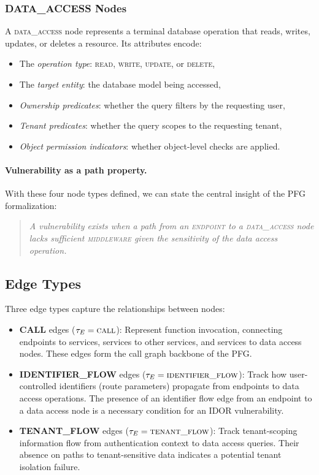 \subsubsection{DATA\_ACCESS Nodes}

A \textsc{data\_access} node represents a terminal database operation that reads, writes, updates, or deletes a resource. Its attributes encode:
\begin{itemize}
    \item The \emph{operation type}: \textsc{read}, \textsc{write}, \textsc{update}, or \textsc{delete},
    \item The \emph{target entity}: the database model being accessed,
    \item \emph{Ownership predicates}: whether the query filters by the requesting user,
    \item \emph{Tenant predicates}: whether the query scopes to the requesting tenant,
    \item \emph{Object permission indicators}: whether object-level checks are applied.
\end{itemize}

\paragraph{Vulnerability as a path property.} With these four node types defined, we can state the central insight of the PFG formalization:

\begin{quote}
\emph{A vulnerability exists when a path from an \textsc{endpoint} to a \textsc{data\_access} node lacks sufficient \textsc{middleware} given the sensitivity of the data access operation.}
\end{quote}

\subsection{Edge Types}

Three edge types capture the relationships between nodes:

\begin{itemize}
    \item \textbf{CALL} edges ($\tau_E = \textsc{call}$): Represent function invocation, connecting endpoints to services, services to other services, and services to data access nodes. These edges form the call graph backbone of the PFG.

    \item \textbf{IDENTIFIER\_FLOW} edges ($\tau_E = \textsc{identifier\_flow}$): Track how user-controlled identifiers (route parameters) propagate from endpoints to data access operations. The presence of an identifier flow edge from an endpoint to a data access node is a necessary condition for an IDOR vulnerability.

    \item \textbf{TENANT\_FLOW} edges ($\tau_E = \textsc{tenant\_flow}$): Track tenant-scoping information flow from authentication context to data access queries. Their absence on paths to tenant-sensitive data indicates a potential tenant isolation failure.
\end{itemize}

